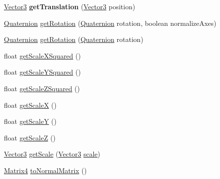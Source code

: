 \begin{DoxyCompactItemize}
\item 
\hypertarget{classairhockeyjava_1_1util_1_1_matrix4_a87d7f65f2ca0cee41f2848428bcf0ff8}{}\hyperlink{classairhockeyjava_1_1util_1_1_vector3}{Vector3} {\bfseries get\+Translation} (\hyperlink{classairhockeyjava_1_1util_1_1_vector3}{Vector3} position)\label{classairhockeyjava_1_1util_1_1_matrix4_a87d7f65f2ca0cee41f2848428bcf0ff8}

\item 
\hyperlink{classairhockeyjava_1_1util_1_1_quaternion}{Quaternion} \hyperlink{classairhockeyjava_1_1util_1_1_matrix4_a32b11cf4162c01f6f4fa96c490ea9b0d}{get\+Rotation} (\hyperlink{classairhockeyjava_1_1util_1_1_quaternion}{Quaternion} rotation, boolean normalize\+Axes)
\item 
\hyperlink{classairhockeyjava_1_1util_1_1_quaternion}{Quaternion} \hyperlink{classairhockeyjava_1_1util_1_1_matrix4_a264d25f6fa8975f922996b466d5f7fb5}{get\+Rotation} (\hyperlink{classairhockeyjava_1_1util_1_1_quaternion}{Quaternion} rotation)
\item 
float \hyperlink{classairhockeyjava_1_1util_1_1_matrix4_a1ac68edbb31a574361c33efc3c3c7c0f}{get\+Scale\+X\+Squared} ()
\item 
float \hyperlink{classairhockeyjava_1_1util_1_1_matrix4_a6d4707da25f30955b2c299c4c0f4d816}{get\+Scale\+Y\+Squared} ()
\item 
float \hyperlink{classairhockeyjava_1_1util_1_1_matrix4_a2cc78ed66ec71590f71aa8ad797ac1e2}{get\+Scale\+Z\+Squared} ()
\item 
float \hyperlink{classairhockeyjava_1_1util_1_1_matrix4_aad4af515d395f88fdd629000dc975fa2}{get\+Scale\+X} ()
\item 
float \hyperlink{classairhockeyjava_1_1util_1_1_matrix4_a47a4cbea42a8a116bb9d885ce7827a77}{get\+Scale\+Y} ()
\item 
float \hyperlink{classairhockeyjava_1_1util_1_1_matrix4_aa080174793abf4e956efe1d0a28181c2}{get\+Scale\+Z} ()
\item 
\hyperlink{classairhockeyjava_1_1util_1_1_vector3}{Vector3} \hyperlink{classairhockeyjava_1_1util_1_1_matrix4_a9efec6b170ac664dc8b7d91d994533c1}{get\+Scale} (\hyperlink{classairhockeyjava_1_1util_1_1_vector3}{Vector3} \hyperlink{classairhockeyjava_1_1util_1_1_matrix4_a6c40d2aa19b65cdc8749121b126a6940}{scale})
\item 
\hyperlink{classairhockeyjava_1_1util_1_1_matrix4}{Matrix4} \hyperlink{classairhockeyjava_1_1util_1_1_matrix4_a45ae836f7ab4da9ac1466901d80cc710}{to\+Normal\+Matrix} ()
\item 

\end{DoxyCompactItemize}
